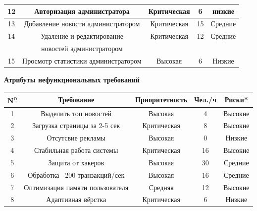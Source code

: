 \begin{center}
\begin{tabular}{|c|c|c|c|c|}
        \hline
        12                               & Авторизация администратора                & Критическая    & 6      & низкие  \\
        \hline
        13                               & Добавление новости администратором        & Критическая    & 15     & Средние \\
        \hline
        14                               & Удаление и редактирование & Критическая    & 12     & Средние \\
                                       &  новостей администратором &     &      &  \\
        \hline
        15                               & Просмотр статистики администратором       & Высокая        & 6      & Низкие  \\
        \hline
    \end{tabular}
\end{center}
\large
\begin{center}
    \textbf{Атрибуты нефункциональных требований\\}
\end{center}
\begin{center}
    \small
    \begin{tabular}{|c|c|c|c|c|}
        \hline
        N\textsuperscript{\underline{o}} & Требование                      & Приоритетность & Чел./ч & Риски*  \\
        \hline
        1                                & Выделить топ новостей           & Высокая        & 4      & Высокие \\
        \hline
        2                                & Загрузка страницы за 2-5 сек    & Критическая    & 8      & Высокие \\
        \hline
        3                                & Отсутсвие рекламы               & Высокая        & 0      & Низкие  \\
        \hline
        4                                & Стабильная работа системы       & Критическая    & 16     & Высокие \\
        \hline
        5                                & Защита от хакеров               & Высокая        & 30     & Средние \\
        \hline
        6                                & Обработка ~200 транзакций/сек   & Высокая        & 16     & Средние \\
        \hline
        7                                & Оптимизация памяти пользователя & Средняя        & 12     & Высокие \\
        \hline
        8                                & Адаптивная вёрстка              & Критическая    & 6      & Низкие  \\
        \hline
    \end{tabular}\\

\end{center}
